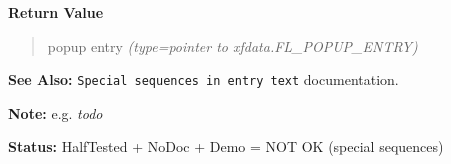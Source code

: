 \begin{boxedminipage}{\funcwidth}
\begin{quote}
      \end{quote}

      \textbf{Return Value}
    \vspace{-1ex}

      \begin{quote}

popup entry
      {\it (type=pointer to xfdata.FL\_POPUP\_ENTRY)}

      \end{quote}

\textbf{See Also:} 
\texttt{Special sequences in entry text} documentation.


\textbf{Note:} 
e.g. \emph{todo}


\textbf{Status:} 
HalfTested + NoDoc + Demo = NOT OK (special sequences)


    \end{boxedminipage}

    \label{xformslib:flnmenu:fl_replace_nmenu_item}

    \vspace{0.5ex}

